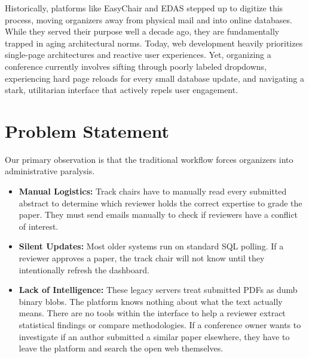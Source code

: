 \documentclass[12pt,a4paper]{report}
\begin{document}
Historically, platforms like EasyChair and EDAS stepped up to digitize this process, moving organizers away from physical mail and into online databases. While they served their purpose well a decade ago, they are fundamentally trapped in aging architectural norms. Today, web development heavily prioritizes single-page architectures and reactive user experiences. Yet, organizing a conference currently involves sifting through poorly labeled dropdowns, experiencing hard page reloads for every small database update, and navigating a stark, utilitarian interface that actively repels user engagement. 

\section{Problem Statement}
Our primary observation is that the traditional workflow forces organizers into administrative paralysis. 

\begin{itemize}
    \item \textbf{Manual Logistics:} Track chairs have to manually read every submitted abstract to determine which reviewer holds the correct expertise to grade the paper. They must send emails manually to check if reviewers have a conflict of interest. 
    \item \textbf{Silent Updates:} Most older systems run on standard SQL polling. If a reviewer approves a paper, the track chair will not know until they intentionally refresh the dashboard.  
    \item \textbf{Lack of Intelligence:} These legacy servers treat submitted PDFs as dumb binary blobs. The platform knows nothing about what the text actually means. There are no tools within the interface to help a reviewer extract statistical findings or compare methodologies. If a conference owner wants to investigate if an author submitted a similar paper elsewhere, they have to leave the platform and search the open web themselves.
\end{itemize}
\end{document}

